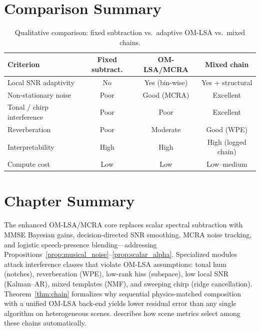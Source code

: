 \section{Comparison Summary}
\label{sec:algo_comparison}

\begin{table}[H]
  \centering
  \caption{Qualitative comparison: fixed subtraction vs.\ adaptive OM-LSA vs.\ mixed chains.}
  \label{tab:algo_compare}
  \small
  \begin{tabular}{lccc}
    \toprule
    \textbf{Criterion} & \textbf{Fixed subtract.} & \textbf{OM-LSA/MCRA} & \textbf{Mixed chain} \\
    \midrule
    Local SNR adaptivity       & No  & Yes (bin-wise) & Yes + structural \\
    Non-stationary noise       & Poor & Good (MCRA)   & Excellent \\
    Tonal / chirp interference & Poor & Poor          & Excellent \\
    Reverberation              & Poor & Moderate      & Good (WPE) \\
    Interpretability           & High & High          & High (logged chain) \\
    Compute cost               & Low  & Low           & Low--medium \\
    \bottomrule
  \end{tabular}
\end{table}

\section{Chapter Summary}
\label{sec:algo_summary}

The enhanced OM-LSA/MCRA core replaces scalar spectral subtraction with MMSE Bayesian gains, decision-directed SNR smoothing, MCRA noise tracking, and logistic speech-presence blending---addressing Propositions~\ref{prop:musical_noise}--\ref{prop:scalar_alpha}. Specialized modules attack interference classes that violate OM-LSA assumptions: tonal hum (notches), reverberation (WPE), low-rank hiss (subspace), low local SNR (Kalman--AR), mixed templates (NMF), and sweeping chirp (ridge cancellation). Theorem~\ref{thm:chain} formalizes why sequential physics-matched composition with a unified OM-LSA back-end yields lower residual error than any single algorithm on heterogeneous scenes.  describes how scene metrics select among these chains automatically.
